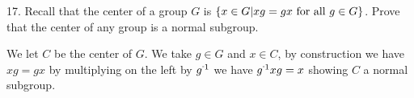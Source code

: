 \begin{mdframed}[style=darkQuesion]
17. Recall that the center of a group $G$ is 
$\left\{x\in G\vert xg=gx \text{ for all }g\in G\right\}$. 
Prove that the center of any group is a normal subgroup. 
\end{mdframed}
\begin{mdframed}[style=darkAnswer,frametitle={Joe Starr}]
We let $C$ be the center of $G$. We take $g\in G$ and $x\in C$, by construction
we have $xg=gx$ by multiplying on the left by $\inv{g}$ we have $\inv{g}xg=x$ 
showing $C$ a normal subgroup.
\end{mdframed}
\newpage